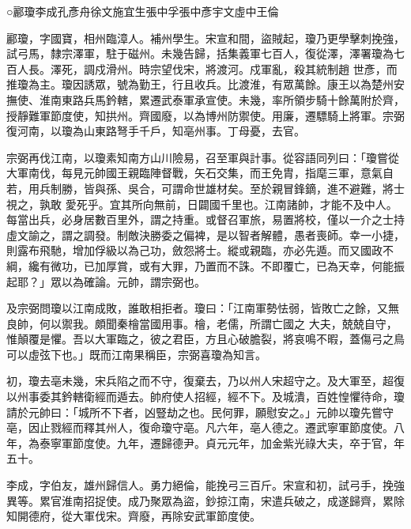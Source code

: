 
\begin{pinyinscope}

 ○酈瓊李成孔彥舟徐文施宜生張中孚張中彥宇文虛中王倫



 酈瓊，字國寶，相州臨漳人。補州學生。宋宣和間，盜賊起，瓊乃更學擊刺挽強，試弓馬，隸宗澤軍，駐于磁州。未幾告歸，括集義軍七百人，復從澤，澤署瓊為七百人長。澤死，調戍滑州。時宗望伐宋，將渡河。戍軍亂，殺其統制趙
 世彥，而推瓊為主。瓊因誘眾，號為勤王，行且收兵。比渡淮，有眾萬餘。康王以為楚州安撫使、淮南東路兵馬鈐轄，累遷武泰軍承宣使。未幾，率所領步騎十餘萬附於齊，授靜難軍節度使，知拱州。齊國廢，以為博州防禦使。用廉，遷驃騎上將軍。宗弼復河南，以瓊為山東路弩手千戶，知亳州事。丁母憂，去官。



 宗弼再伐江南，以瓊素知南方山川險易，召至軍與計事。從容語同列曰：「瓊嘗從大軍南伐，每見元帥國王親臨陣督戰，矢石交集，而王免胄，指麾三軍，意氣自若，用兵制勝，皆與孫、吳合，可謂命世雄材矣。至於親冒鋒鏑，進不避難，將士視之，孰敢
 愛死乎。宜其所向無前，日闢國千里也。江南諸帥，才能不及中人。每當出兵，必身居數百里外，謂之持重。或督召軍旅，易置將校，僅以一介之士持虛文諭之，謂之調發。制敵決勝委之偏裨，是以智者解體，愚者喪師。幸一小捷，則露布飛馳，增加俘級以為己功，斂怨將士。縱或親臨，亦必先遁。而又國政不綱，纔有微功，已加厚賞，或有大罪，乃置而不誅。不即覆亡，已為天幸，何能振起耶？」眾以為確論。元帥，謂宗弼也。



 及宗弼問瓊以江南成敗，誰敢相拒者。瓊曰：「江南軍勢怯弱，皆敗亡之餘，又無良帥，何以禦我。頗聞秦檜當國用事。檜，老儒，所謂亡國之
 大夫，兢兢自守，惟顛覆是懼。吾以大軍臨之，彼之君臣，方且心破膽裂，將哀鳴不暇，蓋傷弓之鳥可以虛弦下也。」既而江南果稱臣，宗弼喜瓊為知言。



 初，瓊去亳未幾，宋兵陷之而不守，復棄去，乃以州人宋超守之。及大軍至，超復以州事委其鈐轄衛經而遁去。帥府使人招經，經不下。及城潰，百姓惶懼待命，瓊請於元帥曰：「城所不下者，凶豎劫之也。民何罪，願慰安之。」元帥以瓊先嘗守亳，因止戮經而釋其州人，復命瓊守亳。凡六年，亳人德之。遷武寧軍節度使。八年，為泰寧軍節度使。九年，遷歸德尹。貞元元年，加金紫光祿大夫，卒于官，年五十。



 李成，字伯友，雄州歸信人。勇力絕倫，能挽弓三百斤。宋宣和初，試弓手，挽強異等。累官淮南招捉使。成乃聚眾為盜，鈔掠江南，宋遣兵破之，成遂歸齊，累除知開德府，從大軍伐宋。齊廢，再除安武軍節度使。




\end{pinyinscope}
